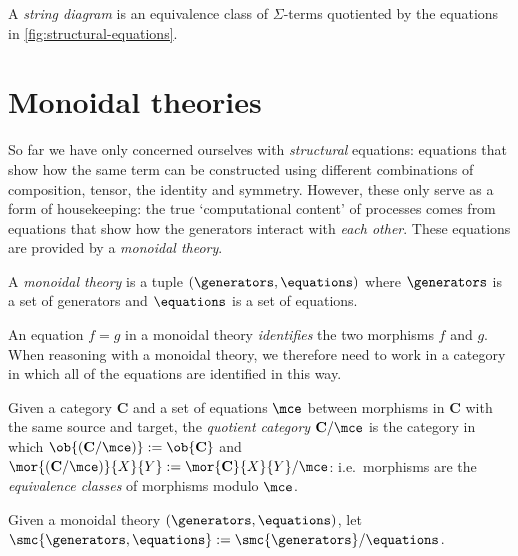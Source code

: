 \begin{definition}
    A \emph{string diagram} is an equivalence class of \(\Sigma\)-terms
    quotiented by the equations in \cref{fig:structural-equations}.
\end{definition}



\section{Monoidal theories}

So far we have only concerned ourselves with \emph{structural} equations:
equations that show how the same term can be constructed using different
combinations of composition, tensor, the identity and symmetry.
However, these only serve as a form of housekeeping: the true `computational
content' of processes comes from equations that show how the generators interact
with \emph{each other}.
These equations are provided by a \emph{monoidal theory}.

\begin{definition}
    A \emph{monoidal theory} is a tuple \((\generators, \equations)\) where
    \(\generators\) is a set of generators and \(\equations\) is a set of
    equations.
\end{definition}

An equation \(f = g\) in a monoidal theory \emph{identifies} the two morphisms
\(f\) and \(g\).
When reasoning with a monoidal theory, we therefore need to work in a category
in which all of the equations are identified in this way.

\begin{definition}
    Given a category \(\mathbf{C}\) and a set of equations \(\mce\) between
    morphisms in \(\mathbf{C}\) with the same source and target, the
    \emph{quotient category} \(\mathbf{C} / \mce\) is the category in which
    \(\ob{(\mathbf{C} / \mce)} := \ob{\mathbf{C}}\) and \(
            \mor{(\mathbf{C} / \mce)}{X}{Y}
            :=
            \mor{\mathbf{C}}{X}{Y} / \mce
    \): i.e.\ morphisms are the \emph{equivalence classes} of morphisms
    modulo \(\mce\).
\end{definition}

\begin{definition}
    Given a monoidal theory \((\generators, \equations)\), let
    \(\smc{\generators, \equations} := \smc{\generators} / \equations\).
\end{definition}

